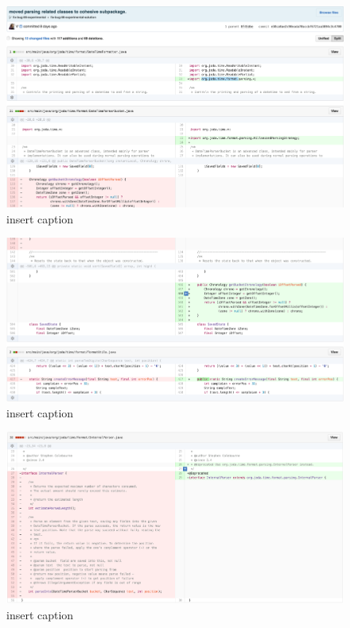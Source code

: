 \begin{figure}[H]
	\centering
	\includegraphics[width=\linewidth]{code114}
	\caption{insert caption}
\end{figure}
\begin{figure}[H]
	\centering
	\includegraphics[width=\linewidth]{code115}
	\caption{insert caption}
\end{figure}
\begin{figure}[H]
	\centering
	\includegraphics[width=\linewidth]{code116}
	\caption{insert caption}
\end{figure}
